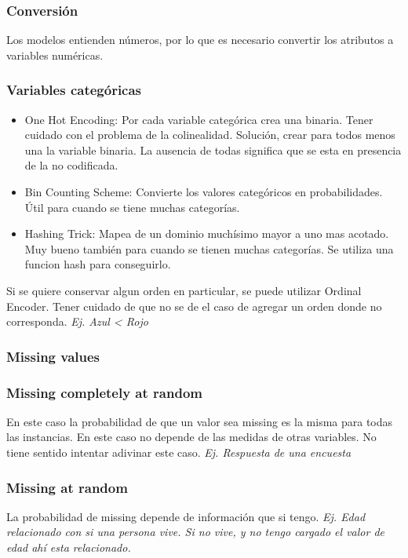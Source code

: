 \documentclass[titlepage,a4paper]{article}
\begin{document}
\subsubsection{Conversión}
Los modelos entienden números, por lo que es necesario convertir los atributos a variables numéricas.



\subsubsection*{Variables categóricas}
\begin{itemize}
    \item One Hot Encoding: Por cada variable categórica crea una binaria. Tener cuidado con el problema de la colinealidad. Solución, crear para todos menos una la variable binaria. La ausencia de todas significa que se esta en presencia de la no codificada.
    \item Bin Counting Scheme: Convierte los valores categóricos en probabilidades. Útil para cuando se tiene muchas categorías.
    \item Hashing Trick: Mapea de un dominio muchísimo mayor a uno mas acotado. Muy bueno también para cuando se tienen muchas categorías. Se utiliza una funcion hash para conseguirlo.
\end{itemize}

Si se quiere conservar algun orden en particular, se puede utilizar Ordinal Encoder. Tener cuidado de que no se de el caso de agregar un orden donde no corresponda. \textit{Ej. Azul < Rojo}


\subsubsection{Missing values}
\subsubsection*{Missing completely at random}
En este caso la probabilidad de que un valor sea missing es la misma para todas las instancias. En este caso no depende de las medidas de otras variables. No tiene sentido intentar adivinar este caso. \textit{Ej. Respuesta de una encuesta}

\subsubsection*{Missing at random}
La probabilidad de missing depende de información que si tengo. \textit{Ej. Edad relacionado con si una persona vive. Si no vive, y no tengo cargado el valor de edad ahí esta relacionado.}
\end{document}
